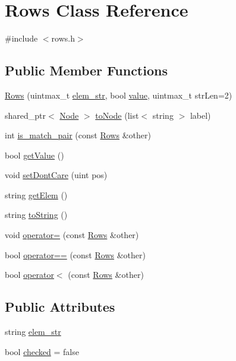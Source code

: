 \hypertarget{class_rows}{}\section{Rows Class Reference}
\label{class_rows}


{\ttfamily \#include $<$rows.\+h$>$}

\subsection*{Public Member Functions}
\begin{DoxyCompactItemize}
\item 
\hyperlink{class_rows_a6c48a7781d187ab7908a772cd0df1a28}{Rows} (uintmax\+\_\+t \hyperlink{class_rows_a0bae45d3eb178a0b8fe253a9c447bbc1}{elem\+\_\+str}, bool \hyperlink{class_rows_a2b3d2fabf2107acdce437f8896a9d999}{value}, uintmax\+\_\+t str\+Len=2)
\item 
shared\+\_\+ptr$<$ \hyperlink{class_node}{Node} $>$ \hyperlink{class_rows_a22f5ff0d92c58ac650fd337d8f0a7894}{to\+Node} (list$<$ string $>$ label)
\item 
int \hyperlink{class_rows_a0c7d1d2c3af24b8de6c88885ad90d68e}{is\+\_\+match\+\_\+pair} (const \hyperlink{class_rows}{Rows} \&other)
\item 
bool \hyperlink{class_rows_a1c7fca7d12a6195f1c68ca7f7b40559d}{get\+Value} ()
\item 
void \hyperlink{class_rows_a7f0b421443b1c6141c8816a7bfd1ac75}{set\+Dont\+Care} (uint pos)
\item 
string \hyperlink{class_rows_ae448dbf8255ceeea29a21125433f9e42}{get\+Elem} ()
\item 
string \hyperlink{class_rows_af097985562c1e8137014839519898494}{to\+String} ()
\item 
void \hyperlink{class_rows_a050e6e5b47e4096f1cdea7f7325fac8e}{operator=} (const \hyperlink{class_rows}{Rows} \&other)
\item 
bool \hyperlink{class_rows_a234bd8fcbb772dad8a6e129c2ccd0e8b}{operator==} (const \hyperlink{class_rows}{Rows} \&other)
\item 
bool \hyperlink{class_rows_ae8eb3bed11f3a6ac4721aa27e1489106}{operator$<$} (const \hyperlink{class_rows}{Rows} \&other)
\end{DoxyCompactItemize}
\subsection*{Public Attributes}
\begin{DoxyCompactItemize}
\item 
string \hyperlink{class_rows_a0bae45d3eb178a0b8fe253a9c447bbc1}{elem\+\_\+str}
\item 
bool \hyperlink{class_rows_acf35a12cc4ce4e4b0c61af3757321803}{checked} = false
\end{DoxyCompactItemize}
